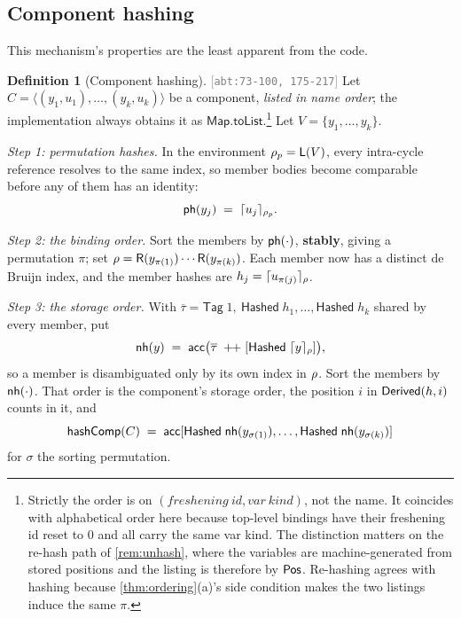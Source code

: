 \documentclass[11pt]{article}
\theoremstyle{definition}
\newtheorem{definition}{Definition}[section]
\theoremstyle{plain}
\theoremstyle{remark}
\newcommand{\src}[1]{{\footnotesize\textcolor{gray}{[\texttt{#1}]}}}
\begin{document}
\subsection{Component hashing}\label{sec:comphash}

This mechanism's properties are the least apparent from the code.

\begin{definition}[Component hashing]\label{def:comphash}
\src{abt:73-100, 175-217} Let $C = \langle (y_1,u_1),\dots,(y_k,u_k)\rangle$ be a
component, \emph{listed in name order}; the implementation always obtains it as
$\mathsf{Map.toList}$.\footnote{Strictly the order is on $(\mathit{freshening\ id}, \mathit{var\
kind})$, not the name. It coincides with alphabetical order here because top-level bindings have their
freshening id reset to $0$ and all carry the same var kind. The distinction matters on the re-hash
path of \cref{rem:unhash}, where the variables are machine-generated from stored positions and the
listing is therefore by $\Pos$. Re-hashing agrees with hashing because \cref{thm:ordering}(a)'s side
condition makes the two listings induce the same $\pi$.} Let $V = \{y_1,\dots,y_k\}$.

\emph{Step 1: permutation hashes.} In the environment $\HEnv_p = \mathsf{L}(V)$, every intra-cycle
reference resolves to the same index, so member bodies become comparable before any of them has an
identity:
\[
  \phash{y_j} \;=\; \uhash{\HEnv_p}{u_j}.
\]

\emph{Step 2: the binding order.} Sort the members by $\phash{\cdot}$, \textbf{stably}, giving a
permutation $\pi$; set $\HEnv = \mathsf{R}(y_{\pi(1)})\cdots\mathsf{R}(y_{\pi(k)})$. Each member now
has a distinct de Bruijn index, and the member hashes are $h_j = \uhash{\HEnv}{u_{\pi(j)}}$.

\emph{Step 3: the storage order.} With
$\overline{\tau} = \mathsf{Tag}\;1,\ \mathsf{Hashed}\;h_1,\dots,\mathsf{Hashed}\;h_k$ shared by every
member, put
\[
  \nhash{y} \;=\; \mathsf{acc}\bigl(\overline{\tau} \;+\!\!+\; [\mathsf{Hashed}\;\uhash{\HEnv}{\uvar{y}}]\bigr),
\]
so a member is disambiguated only by its own index in $\HEnv$. Sort the members by $\nhash{\cdot}$.
That order is the component's storage order, the position $i$ in $\UDer{h}{i}$ counts in it, and
\[
  \comphash(C) \;=\; \mathsf{acc}[\mathsf{Hashed}\;\nhash{y_{\sigma(1)}},\dots,\mathsf{Hashed}\;\nhash{y_{\sigma(k)}}]
\]
for $\sigma$ the sorting permutation.
\end{definition}
\end{document}
